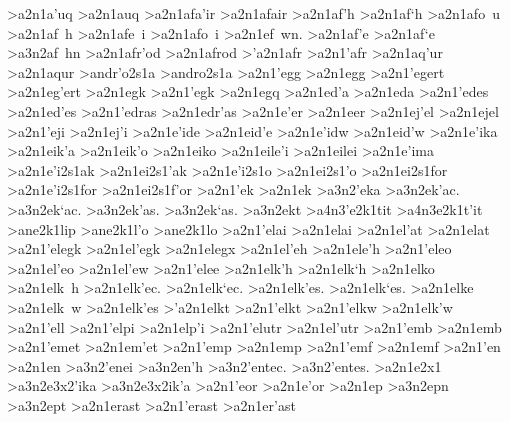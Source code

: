 {>a2n1a'uq 		%
>a2n1auq
>a2n1afa'ir 		%
>a2n1afair
>a2n1af'h		%
>a2n1af`h 
>a2n1afo~u
>a2n1af~h		
>a2n1afe~i
>a2n1afo~i 
>a2n1ef~wn.
>a2n1af'e
>a2n1af`e
	>a3n2af~hn		%
>a2n1afr'od 		%
>a2n1afrod
>'a2n1afr    		%
>a2n1'afr
>a2n1aq'ur 		%
>a2n1aqur
>andr'o2s1a 		%
>andro2s1a
>a2n1'egg 		%
>a2n1egg
>a2n1'egert 		%
>a2n1eg'ert
>a2n1egk 		%
>a2n1'egk 		%
>a2n1egq  		%
>a2n1ed'a 		%
>a2n1eda
>a2n1'edes 		%
>a2n1ed'es
>a2n1'edras 		%
>a2n1edr'as
>a2n1e'er 		%
>a2n1eer
>a2n1ej'el  		%
>a2n1ejel
>a2n1'eji 		%
>a2n1ej'i
>a2n1e'ide 		%
>a2n1eid'e
>a2n1e'idw 		%
>a2n1eid'w
>a2n1e'ika 		%
>a2n1eik'a
>a2n1eik'o 		%
>a2n1eiko
>a2n1eile'i 		%
>a2n1eilei
>a2n1e'ima 		%
>a2n1e'i2s1ak  		%
>a2n1ei2s1'ak
>a2n1e'i2s1o  		%
>a2n1ei2s1'o
>a2n1ei2s1for 		%
>a2n1e'i2s1for 		%
>a2n1ei2s1f'or
>a2n1'ek   		%
>a2n1ek
	>a3n2'eka 		%
	>a3n2ek'ac. 		%
	>a3n2ek`ac.
	>a3n2ek'as.
	>a3n2ek`as.
	>a3n2ekt 		%
		>a4n3'e2k1tit		%
		>a4n3e2k1t'it
>ane2k1lip 		%
>ane2k1l'o		%
>ane2k1lo
>a2n1'elai   		%
>a2n1elai
>a2n1el'at		%
>a2n1elat
>a2n1'elegk		%
>a2n1el'egk
>a2n1elegx		%
>a2n1el'eh   		%
>a2n1ele'h
>a2n1'eleo		%
>a2n1el'eo
>a2n1el'ew
>a2n1'elee
>a2n1elk'h 		%
>a2n1elk`h
>a2n1elko
>a2n1elk~h
>a2n1elk'ec.
>a2n1elk`ec.
>a2n1elk'es.
>a2n1elk`es.
>a2n1elke
>a2n1elk~w
>a2n1elk'es
>'a2n1elkt   		%
>a2n1'elkt
>a2n1'elkw		%
>a2n1elk'w
>a2n1'ell    		%
>a2n1'elpi		%
>a2n1elp'i
>a2n1'elutr %
>a2n1el'utr
>a2n1'emb  		%
>a2n1emb
>a2n1'emet 		%
>a2n1em'et
>a2n1'emp  		%
>a2n1emp
>a2n1'emf  		%
>a2n1emf
>a2n1'en   		%
>a2n1en
	>a3n2'enei  		%
	>a3n2en'h   		%
	>a3n2'entec. 		%
	>a3n2'entes.
>a2n1e2x1  		%
	>a3n2e3x2'ika 		%
	>a3n2e3x2ik'a
>a2n1'eor		%
>a2n1e'or
>a2n1ep    		%
	>a3n2epn  	%
	>a3n2ept  	%
>a2n1erast  		%
>a2n1'erast 		%
>a2n1er'ast
}
